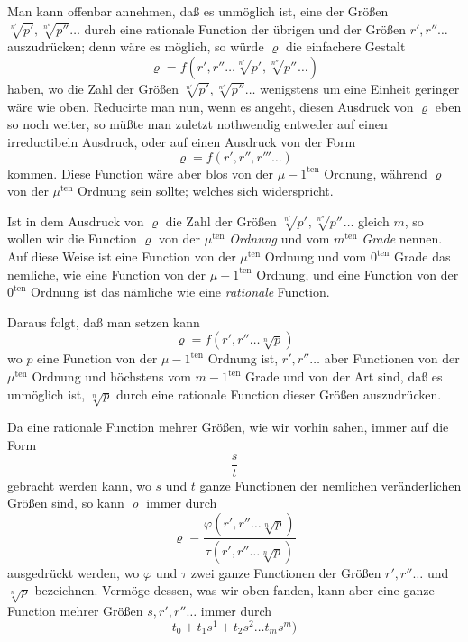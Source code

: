 \documentclass{article}
\begin{document}
Man kann offenbar annehmen, daß es unmöglich ist, eine der Größen $\sqrt[n']{p'}, \sqrt[n'']{p''} \ldots$ durch eine rationale Function der übrigen und der Größen $r', r'' \ldots$ auszudrücken; denn wäre es möglich, so würde $\varrho$ die einfachere Gestalt
\[ \varrho = f(r', r'' \ldots \sqrt[n']{p'}, \sqrt[n'']{p''} \ldots) \]
haben, wo die Zahl der Größen $\sqrt[n']{p'}, \sqrt[n'']{p''} \ldots$ wenigstens um eine Einheit geringer wäre wie oben. Reducirte man nun, wenn es angeht, diesen Ausdruck von $\varrho$ eben so noch weiter, so müßte man zuletzt nothwendig entweder auf einen irreductibeln Ausdruck, oder auf einen Ausdruck von der Form
\[ \varrho = f(r', r'', r''' \ldots) \]
kommen. Diese Function wäre aber blos von der $\mu - 1^{\text{ten}}$ Ordnung, während $\varrho$ von der $\mu^{\text{ten}}$ Ordnung sein sollte; welches sich widerspricht.

Ist in dem Ausdruck von $\varrho$ die Zahl der Größen $\sqrt[n']{p'}, \sqrt[n'']{p''} \ldots$ gleich $m$, so wollen wir die Function $\varrho$ von der $\mu^{\text{ten}}$ \emph{Ordnung} und vom $m^{\text{ten}}$ \emph{Grade} nennen. Auf diese Weise ist eine Function von der $\mu^{\text{ten}}$ Ordnung und vom $0^{\text{ten}}$ Grade das nemliche, wie eine Function von der $\mu - 1^{\text{ten}}$ Ordnung, und eine Function von der $0^{\text{ten}}$ Ordnung ist das nämliche wie eine \emph{rationale} Function.

Daraus folgt, daß man setzen kann
\[ \varrho = f(r', r'' \ldots \sqrt[n]{p}) \]
wo $p$ eine Function von der $\mu - 1^{\text{ten}}$ Ordnung ist, $r', r'' \ldots$ aber Functionen von der $\mu^{\text{ten}}$ Ordnung und höchstens vom $m - 1^{\text{ten}}$ Grade und von der Art sind, daß es unmöglich ist, $\sqrt[n]{p}$ durch eine rationale Function dieser Größen auszudrücken.

Da eine rationale Function mehrer Größen, wie wir vorhin sahen, immer auf die Form
\[ \frac{s}{t} \]
gebracht werden kann, wo $s$ und $t$ ganze Functionen der nemlichen veränderlichen Größen sind, so kann $\varrho$ immer durch
\[ \varrho = \frac{\varphi(r', r'' \ldots \sqrt[n]{p})}{\tau(r', r'' \ldots \sqrt[n]{p})} \]
ausgedrückt werden, wo $\varphi$ und $\tau$ zwei ganze Functionen der Größen $r', r'' \ldots$ und $\sqrt[n]{p}$ bezeichnen. Vermöge dessen, was wir oben fanden, kann aber eine ganze Function mehrer Größen $s, r', r'' \ldots$ immer durch
\[ t_0 + t_1 s^{1} + t_2 s^{2} \ldots t_m s^{m}) \]
\end{document}
